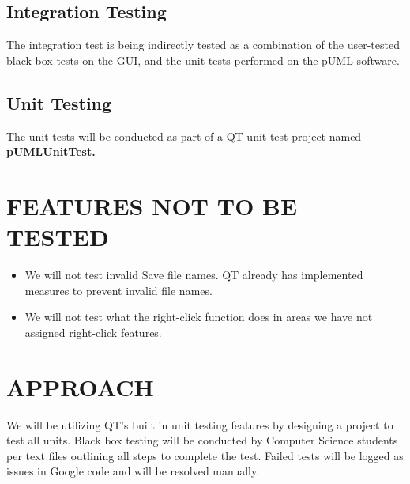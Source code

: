 \documentclass[twoside,letterpaper]{article}
\begin{document}
\subsection[]{\bfseries Integration Testing} 

The integration test is being indirectly tested as a combination of the user-tested black box tests on the GUI, and the unit tests performed on the pUML software.

\bigskip


\subsection[]{\bfseries Unit Testing} 

The unit tests will be conducted as part of a QT unit test project named {\bfseries pUMLUnitTest.} 

\bigskip


\section[FEATURES NOT TO BE TESTED]{\bfseries
FEATURES NOT TO BE TESTED}

\begin{itemize}
\item We will not test invalid Save file names. QT already has implemented measures to prevent invalid file names.
\item We will not test what the right-click function does in areas we have not assigned right-click features.
\end{itemize}



\section[APPROACH]{\bfseries APPROACH}

We will be utilizing QT's built in unit testing features by designing a project to test all units. 
Black box testing will be conducted by Computer Science students per text files outlining all steps to complete the test. Failed tests will be logged as issues in Google code and will be resolved manually.
\end{document}
